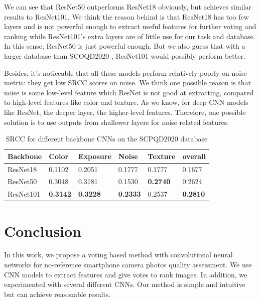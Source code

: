 \documentclass[journal]{IEEEtran}
\begin{document}
We can see that ResNet50 outperforms ResNet18 obviously, but achieves similar results to ResNet101. We think the reason behind is that ResNet18 has too few layers and is not powerful enough to extract useful features for further voting and ranking while ResNet101's extra layers are of little use for our task and database. In this sense, ResNet50 is just powerful enough. But we also guess that with a larger database than SCOQD2020 \cite{9191104}, ResNet101 would possibly perform better.

Besides, it's noticeable that all these models perform relatively poorly on noise metric: they get low SRCC scores on noise. We think one possible reason is that noise is some low-level feature which ResNet is not good at extracting, compared to high-level features like color and texture. As we know, for deep CNN models like ResNet, the deeper layer, the higher-level features. Therefore, one possible solution is to use outputs from shallower layers for noise related features.

\begin{table}[]
\centering
\caption{SRCC for different backbone CNNs on the SCPQD2020 database}\label{cnns}
\begin{tabular}{llllll}
\toprule
Backbone & Color      & Exposure & Noise      & Texture  & overall  \\
\midrule
ResNet18     & 0.1102 & 0.2051 & 0.1777 & 0.1777 & 0.1677 \\
ResNet50     & 0.3048 & 0.3181 & 0.1530 & \textbf{0.2740} & 0.2624 \\
ResNet101    & \textbf{0.3142} & \textbf{0.3228} & \textbf{0.2333} & 0.2537 & \textbf{0.2810} \\
\bottomrule
\end{tabular}
\end{table}

\section{Conclusion}
In this work, we propose a voting based method with convolutional neural networks for no-reference smartphone camera photos quality assessment. We use CNN models to extract features and give votes to rank images. In addition, we experimented with several different CNNs. Our method is simple and intuitive but can achieve reasonable results.





\end{document}
